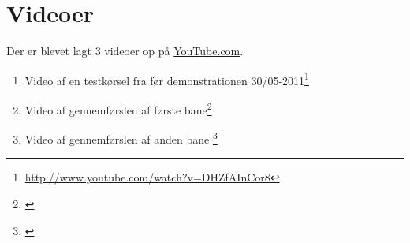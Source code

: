 \chapter{Videoer}\label{videoer}
Der er blevet lagt 3 videoer op på \url{YouTube.com}.
\begin{enumerate}
\item Video af en testkørsel fra før demonstrationen 30/05-2011\footnote{\url{http://www.youtube.com/watch?v=DHZfAInCor8}}
\item Video af gennemførslen af første bane\footnote{\url{}}
\item Video af gennemførslen af anden bane \footnote{\url{}}
\end{enumerate}